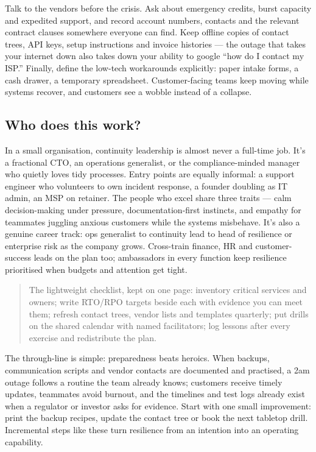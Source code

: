 Talk to the vendors before the crisis. Ask about emergency credits, burst capacity and expedited support, and record account numbers, contacts and the relevant contract clauses somewhere everyone can find. Keep offline copies of contact trees, API keys, setup instructions and invoice histories — the outage that takes your internet down also takes down your ability to google ``how do I contact my ISP.'' Finally, define the low-tech workarounds explicitly: paper intake forms, a cash drawer, a temporary spreadsheet. Customer-facing teams keep moving while systems recover, and customers see a wobble instead of a collapse.



\subsection{Who does this work?}


In a small organisation, continuity leadership is almost never a full-time job. It's a fractional CTO, an operations generalist, or the compliance-minded manager who quietly loves tidy processes. Entry points are equally informal: a support engineer who volunteers to own incident response, a founder doubling as IT admin, an MSP on retainer. The people who excel share three traits — calm decision-making under pressure, documentation-first instincts, and empathy for teammates juggling anxious customers while the systems misbehave. It's also a genuine career track: ops generalist to continuity lead to head of resilience or enterprise risk as the company grows. Cross-train finance, HR and customer-success leads on the plan too; ambassadors in every function keep resilience prioritised when budgets and attention get tight.



\begin{quote}\small
The lightweight checklist, kept on one page: inventory critical services and owners; write RTO/RPO targets beside each with evidence you can meet them; refresh contact trees, vendor lists and templates quarterly; put drills on the shared calendar with named facilitators; log lessons after every exercise and redistribute the plan.
\end{quote}


The through-line is simple: preparedness beats heroics. When backups, communication scripts and vendor contacts are documented and practised, a 2am outage follows a routine the team already knows; customers receive timely updates, teammates avoid burnout, and the timelines and test logs already exist when a regulator or investor asks for evidence. Start with one small improvement: print the backup recipes, update the contact tree or book the next tabletop drill. Incremental steps like these turn resilience from an intention into an operating capability.

